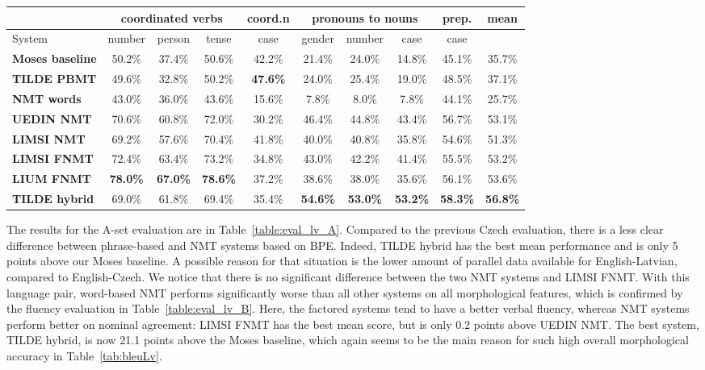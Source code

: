 \documentclass[11pt,letterpaper,final,nohyperref]{article}
\begin{document}
\begin{table*}[tb] %
\begin{center}
\small
\begin{tabular}{ l|ccc|c|ccc|c||c }
\hline
& \multicolumn{3}{c}{\textbf{coordinated verbs}} & \multicolumn{1}{c}{\textbf{coord.n}} & \multicolumn{3}{c}{\textbf{pronouns to nouns}} & \multicolumn{1}{c}{\textbf{prep.}}  & \multicolumn{1}{c}{\textbf{mean}} \\
\hline
System & number & person & tense & case & gender & number & case & case & \\
\hline
\textbf{Moses baseline} & 50.2\% & 37.4\% & 50.6\% & 42.2\% & 21.4\% & 24.0\% & 14.8\% & 45.1\% & 35.7\% \\
\textbf{TILDE PBMT}     & 49.6\% & 32.8\% & 50.2\% & \textbf{47.6\%} & 24.0\% & 25.4\% & 19.0\% & 48.5\% & 37.1\% \\
\textbf{NMT words}      & 43.0\% & 36.0\% & 43.6\% & 15.6\% &  7.8\% &  8.0\% &  7.8\% & 44.1\% & 25.7\% \\
\textbf{UEDIN NMT}      & 70.6\% & 60.8\% & 72.0\% & 30.2\% & 46.4\% & 44.8\% & 43.4\% & 56.7\% & 53.1\% \\
\textbf{LIMSI NMT}      & 69.2\% & 57.6\% & 70.4\% & 41.8\% & 40.0\% & 40.8\% & 35.8\% & 54.6\% & 51.3\% \\ 
\textbf{LIMSI FNMT}     & 72.4\% & 63.4\% & 73.2\% & 34.8\% & 43.0\% & 42.2\% & 41.4\% & 55.5\% & 53.2\% \\
\textbf{LIUM FNMT}      & \textbf{78.0\%} & \textbf{67.0\%} & \textbf{78.6\%} & 37.2\% & 38.6\% & 38.0\% & 35.6\% & 56.1\% & 53.6\% \\
\textbf{TILDE hybrid}   & 69.0\% & 61.8\% & 69.4\% & 35.4\% & \textbf{54.6\%} & \textbf{53.0\%} & \textbf{53.2\%} & \textbf{58.3\%} & \textbf{56.8\%} \\
\hline
 \end{tabular} 
\caption{\label{table:eval_lv_B} Sentence pair evaluation for English-to-Latvian (B-set).}
\end{center}
\end{table*}


The results for the A-set evaluation are in Table~\ref{table:eval_lv_A}.
Compared to the previous Czech evaluation, there is a less clear difference
between phrase-based and NMT systems based on BPE. Indeed, TILDE hybrid has
the best mean performance and is only 5 points above our Moses
baseline. A possible reason for that situation is the lower
amount of parallel data available for English-Latvian,
compared to English-Czech.
We notice that there is no significant difference between the two
NMT systems and LIMSI FNMT.
With this language pair, word-based
NMT performs significantly worse than all other systems on all morphological
features, which is confirmed by the fluency evaluation in Table~\ref{table:eval_lv_B}.
Here, the factored systems tend to have a better verbal fluency, whereas
NMT systems perform better on nominal agreement: LIMSI FNMT has the best mean score,
but is only 0.2 points above UEDIN NMT. The best system, TILDE hybrid, is
now 21.1 points above the Moses baseline, which again seems to be the main
reason for such high overall morphological accuracy in Table~\ref{tab:bleuLv}.
\end{document}
